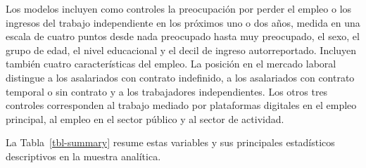\documentclass[
  spanish,
  12pt,
]{article}
\begin{document}
Los modelos incluyen como controles la preocupación por perder el empleo
o los ingresos del trabajo independiente en los próximos uno o dos años,
medida en una escala de cuatro puntos desde nada preocupado hasta muy
preocupado, el sexo, el grupo de edad, el nivel educacional y el decil
de ingreso autorreportado. Incluyen también cuatro características del
empleo. La posición en el mercado laboral distingue a los asalariados
con contrato indefinido, a los asalariados con contrato temporal o sin
contrato y a los trabajadores independientes. Los otros tres controles
corresponden al trabajo mediado por plataformas digitales en el empleo
principal, al empleo en el sector público y al sector de actividad.

La Tabla~\ref{tbl-summary} resume estas variables y sus principales
estadísticos descriptivos en la muestra analítica.
\end{document}
